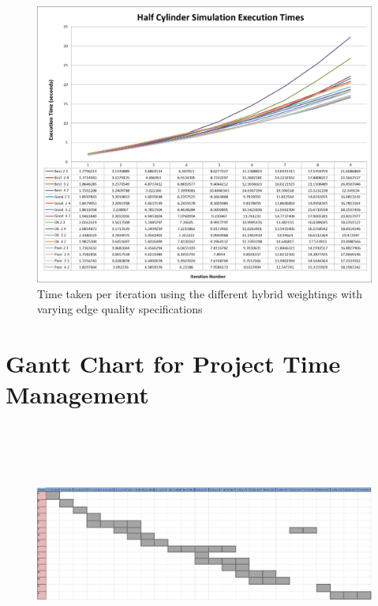 \begin{figure}[H]
  \centerline{\includegraphics[width=120mm, scale=0.5]{../Graphics/HalfCylinder/ExecutionTimes.png}}
  \caption{Time taken per iteration using the different hybrid weightings with varying edge quality specifications}
\end{figure}

 
\section{Gantt Chart for Project Time Management}
\pagestyle{empty}
\begin{landscape}
\vspace*{1cm}
\hspace*{-3cm}
\begin{figure}[H]
\includegraphics[width =700px, height=300px]{../Graphics/TimePlanUpdated2.png} \par
\end{figure}
\end{landscape}

